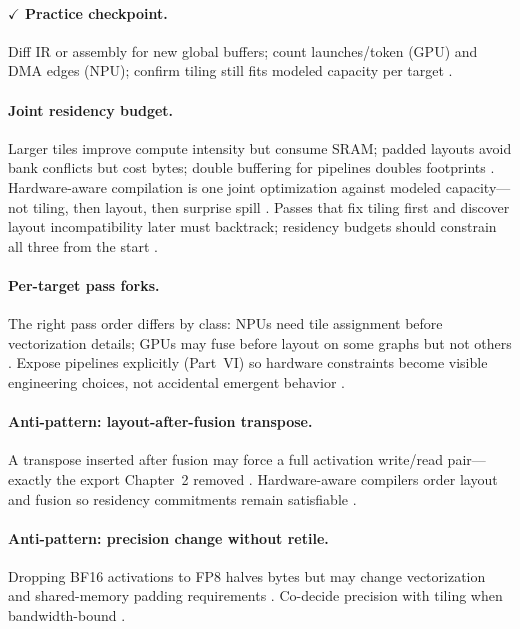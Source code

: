 \paragraph{$\checkmark$ Practice checkpoint.}
Diff IR or assembly for new global buffers; count launches/token (GPU) and DMA edges (NPU); confirm tiling still fits modeled capacity per target \citep{taxbreak2026,yirage2026,memoryfloor2026}.

\paragraph{Joint residency budget.}
Larger tiles improve compute intensity but consume SRAM; padded layouts avoid bank conflicts but cost bytes; double buffering for pipelines doubles footprints \citep{nvidia2022hopper,shah2024flashattention3}.
Hardware-aware compilation is one joint optimization against modeled capacity---not tiling, then layout, then surprise spill \citep{chen2020compilerbasedhardw,yirage2026}.
Passes that fix tiling first and discover layout incompatibility later must backtrack; residency budgets should constrain all three from the start \citep{lai2023relax}.

\paragraph{Per-target pass forks.}
The right pass order differs by class: NPUs need tile assignment before vectorization details; GPUs may fuse before layout on some graphs but not others \citep{chen2018tvm,chen2020compilerbasedhardw}.
Expose pipelines explicitly (Part~VI) so hardware constraints become visible engineering choices, not accidental emergent behavior \citep{yirage2026}.

\paragraph{Anti-pattern: layout-after-fusion transpose.}
A transpose inserted after fusion may force a full activation write/read pair---exactly the export Chapter~2 removed \citep{lai2023relax,chen2020compilerbasedhardw,memoryfloor2026}.
Hardware-aware compilers order layout and fusion so residency commitments remain satisfiable \citep{yirage2026,taxbreak2026}.

\paragraph{Anti-pattern: precision change without retile.}
Dropping BF16 activations to FP8 halves bytes but may change vectorization and shared-memory padding requirements \citep{shah2024flashattention3,liu2024deepseekv3}.
Co-decide precision with tiling when bandwidth-bound \citep{memoryfloor2026,patel2025llminference}.

